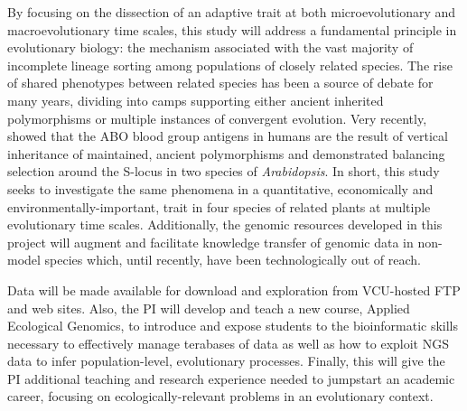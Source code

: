 By focusing on the dissection of an adaptive trait at both microevolutionary and macroevolutionary 
time scales, this study will address a fundamental principle in evolutionary biology: the mechanism 
associated with the vast majority of incomplete lineage sorting among populations of closely related species.  
The rise of shared phenotypes between related species has been a source of debate for many years, dividing 
into camps supporting either ancient inherited polymorphisms or multiple instances of convergent evolution.  Very recently, 
\citet{Segurel:vf} showed that the ABO blood group antigens in humans are the result of vertical inheritance 
of maintained, ancient polymorphisms and \citet{Roux:2012eb} demonstrated balancing selection around the S-locus in two 
species of  \emph{Arabidopsis}.  
In short, this study seeks to investigate the same phenomena in a quantitative, economically and 
environmentally-important, trait in four species of related plants at multiple evolutionary time scales.  Additionally, 
the genomic resources developed in this project will augment and facilitate knowledge transfer of genomic data in non-model 
species which, until recently, have been technologically out of reach.



Data will be made available for download and exploration from VCU-hosted FTP and web sites.  Also, the PI will develop and teach a 
new course, Applied Ecological Genomics, to introduce and expose students to the bioinformatic skills necessary 
to effectively manage terabases of data as well as how to exploit NGS data to infer population-level, evolutionary processes.   
Finally, this will give the PI additional teaching and research experience needed to jumpstart an academic career, focusing on 
ecologically-relevant problems in an evolutionary context.

